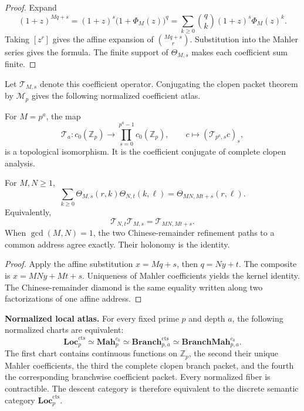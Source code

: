 \begin{proof}
Expand
\[
 (1+z)^{Mq+s}
 =(1+z)^s\bigl(1+\Phi_M(z)\bigr)^q
 =\sum_{k\geq0}\binom qk(1+z)^s\Phi_M(z)^k.
\]
Taking \([z^r]\) gives the affine expansion of \(\binom{Mq+s}{r}\).  Substitution into the Mahler series gives the formula.  The finite support of \(\Theta_{M,s}\) makes each coefficient sum finite.
\end{proof}

Let \(\mathcal T_{M,s}\) denote this coefficient operator.  Conjugating the clopen packet theorem by \(\mathcal M_p\) gives the following normalized coefficient atlas.

\begin{corollary}
\label{cor:block08-coefficient-packet}
For \(M=p^a\), the map
\[
 \mathcal T_a:c_0(\mathbb Z_p)
 \longrightarrow
 \prod_{s=0}^{p^a-1}c_0(\mathbb Z_p),
 \qquad
 c\longmapsto(\mathcal T_{p^a,s}c)_s,
\]
is a topological isomorphism.  It is the coefficient conjugate of complete clopen analysis.
\end{corollary}

\begin{theorem}
\label{thm:block08-kernel-composition}
For \(M,N\geq1\),
\[
 \boxed{
 \sum_{k\geq0}
 \Theta_{M,s}(r,k)\Theta_{N,t}(k,\ell)
 =
 \Theta_{MN,Mt+s}(r,\ell).}
\]
Equivalently,
\[
 \boxed{
 \mathcal T_{N,t}\mathcal T_{M,s}
 =
 \mathcal T_{MN,Mt+s}.}
\]
When \(\gcd(M,N)=1\), the two Chinese-remainder refinement paths to a common address agree exactly.  Their holonomy is the identity.
\end{theorem}

\begin{proof}
Apply the affine substitution \(x=Mq+s\), then \(q=Ny+t\).  The composite is \(x=MNy+Mt+s\).  Uniqueness of Mahler coefficients yields the kernel identity.  The Chinese-remainder diamond is the same equality written along two factorizations of one affine address.
\end{proof}

\begin{resultbox}
\textbf{Normalized local atlas.}
For every fixed prime \(p\) and depth \(a\), the following normalized charts are equivalent:
\[
 \boxed{
 \mathbf{Loc}^{\mathrm{cts}}_p
 \simeq
 \mathbf{Mah}^{c_0}_p
 \simeq
 \mathbf{Branch}^{\mathrm{cts}}_{p,a}
 \simeq
 \mathbf{BranchMah}^{c_0}_{p,a}.}
\]
The first chart contains continuous functions on \(\mathbb Z_p\), the second their unique Mahler coefficients, the third the complete clopen branch packet, and the fourth the corresponding branchwise coefficient packet.  Every normalized fiber is contractible.  The descent category is therefore equivalent to the discrete semantic category \(\mathbf{Loc}^{\mathrm{cts}}_p\).
\end{resultbox}

